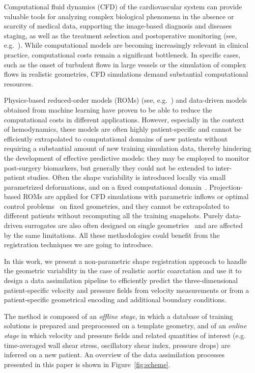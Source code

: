 Computational fluid dynamics (CFD) of the cardiovascular system can provide valuable tools for analyzing complex biological phenomena in the absence or scarcity of medical data,  supporting the image-based diagnosis and diseases staging, as well as the treatment selection and postoperative monitoring (see, e.g.~\cite{quarteroni24_cardio, lesage2023mapping,Morris18}). 
%
While computational models are becoming increasingly relevant in clinical practice, computational costs remain a significant bottleneck. In specific cases, such as the onset of turbulent flows in large vessels or the simulation of complex flows in realistic geometries, CFD simulations demand substantial computational resources.

Physics-based reduced-order models (ROMs) (see, e.g.~\cite{benner_model_2017, hesthaven2016certified, rozza2022advanced}) and data-driven models obtained from machine learning have proven to be able to reduce the computational costs in different applications. However, especially in the context of hemodynamics, these models are often highly patient-specific and cannot be efficiently extrapolated to computational domains of new patients without requiring a substantial amount of new training simulation data, thereby hindering the development of effective predictive models: they may be employed to monitor post-surgery biomarkers, but generally they could not be extended to inter-patient studies. Often the shape variability is introduced locally via small parametrized deformations, and on a fixed computational domain~\cite{Ballarin2016}. Projection-based ROMs are applied for CFD simulations with parametric inflows or optimal control problems~\cite{Girfoglio2022, Zainib2019} on fixed geometries, and they cannot be extrapolated to different patients without recomputing all the training snapshots. Purely data-driven surrogates are also often designed on single geometries~\cite{Fresca2020} and are affected by the same limitations. All these methodologies could benefit from the registration techniques we are going to introduce.

In this work, we present a non-parametric shape registration approach to handle the geometric variability in the case of realistic aortic coarctation and
use it to design a data assimilation pipeline to efficiently predict the three-dimensional patient-specific velocity and pressure fields from velocity measurements or from a patient-specific geometrical encoding
and additional boundary conditions.

The method is composed of an \textit{offline stage}, in which a database of training solutions is prepared and preprocessed on a template geometry, and of an \textit{online stage} in which 
velocity and pressure fields and related quantities of interest (e.g. time-averaged wall shear stress, oscillatory shear index, pressure drops) are inferred on a new patient. 
An overview of the data assimilation processes presented in this paper is shown in Figure~\ref{fig:scheme}. 
%


